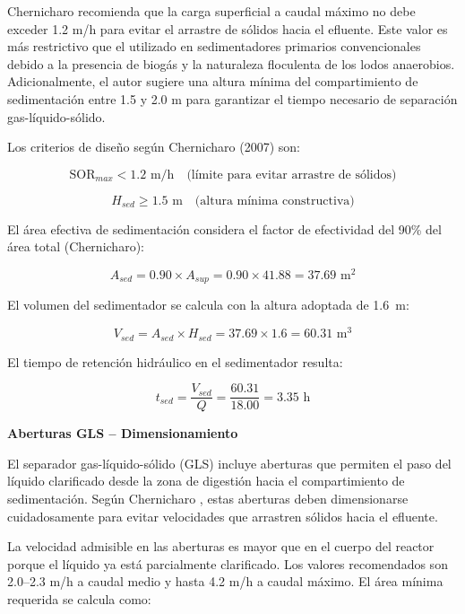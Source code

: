 Chernicharo recomienda que la carga superficial a caudal máximo no debe exceder 1.2 m/h para evitar el arrastre de sólidos hacia el efluente. Este valor es más restrictivo que el utilizado en sedimentadores primarios convencionales debido a la presencia de biogás y la naturaleza floculenta de los lodos anaerobios. Adicionalmente, el autor sugiere una altura mínima del compartimiento de sedimentación entre 1.5 y 2.0 m para garantizar el tiempo necesario de separación gas-líquido-sólido.

Los criterios de diseño según Chernicharo (2007) son:

\begin{equation}
\text{SOR}_{max} < 1.2 \text{ m/h} \quad \text{(límite para evitar arrastre de sólidos)}
\end{equation}

\begin{equation}
H_{sed} \geq 1.5 \text{ m} \quad \text{(altura mínima constructiva)}
\end{equation}

El área efectiva de sedimentación considera el factor de efectividad del 90\% del área total (Chernicharo):

\begin{equation}
A_{sed} = 0.90 \times A_{sup} = 0.90 \times 41.88 = 37.69 \text{ m}^2
\end{equation}

El volumen del sedimentador se calcula con la altura adoptada de 1.6~m:

\begin{equation}
V_{sed} = A_{sed} \times H_{sed} = 37.69 \times 1.6 = 60.31 \text{ m}^3
\end{equation}

El tiempo de retención hidráulico en el sedimentador resulta:

\begin{equation}
t_{sed} = \frac{V_{sed}}{Q} = \frac{60.31}{18.00} = 3.35 \text{ h}
\end{equation}

\textbf{Aberturas GLS -- Dimensionamiento}

El separador gas-líquido-sólido (GLS) incluye aberturas que permiten el paso del líquido clarificado desde la zona de digestión hacia el compartimiento de sedimentación. Según Chernicharo \cite{chernicharo2007}, estas aberturas deben dimensionarse cuidadosamente para evitar velocidades que arrastren sólidos hacia el efluente.

La velocidad admisible en las aberturas es mayor que en el cuerpo del reactor porque el líquido ya está parcialmente clarificado. Los valores recomendados son 2.0--2.3 m/h a caudal medio y hasta 4.2 m/h a caudal máximo. El área mínima requerida se calcula como:

